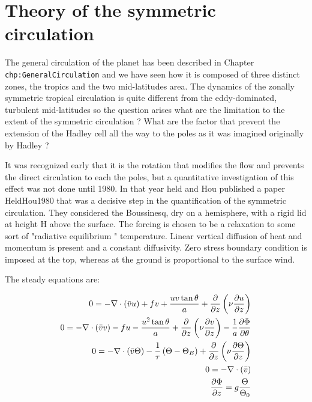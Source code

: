 \section{Theory of the symmetric
circulation}\label{theory-of-the-symmetric-circulation}

The general circulation of the planet has been described in Chapter
\texttt{chp:GeneralCirculation} and we have seen how it is composed of
three distinct zones, the tropics and the two mid-latitudes area. The
dynamics of the zonally symmetric tropical circulation is quite
different from the eddy-dominated, turbulent mid-latitudes so the
question arises what are the limitation to the extent of the symmetric
circulation ? What are the factor that prevent the extension of the
Hadley cell all the way to the poles as it was imagined originally by
Hadley ?

It was recognized early that it is the rotation that modifies the flow
and prevents the direct circulation to each the poles, but a
quantitative investigation of this effect was not done until 1980. In
that year held and Hou published a paper HeldHou1980 that was a decisive
step in the quantification of the symmetric circulation. They considered
the Boussinesq, dry on a hemisphere, with a rigid lid at height H above
the surface. The forcing is chosen to be a relaxation to some sort of
"radiative equilibrium " temperature. Linear vertical diffusion of heat
and momentum is present and a constant diffusivity. Zero stress boundary
condition is imposed at the top, whereas at the ground is proportional
to the surface wind.

The steady equations are:

\[\begin{aligned}
0 = -\nabla\cdot(\bar{v}u) + fv +\frac{u v \tan\theta}{a} + \frac{\partial }{\partial z}\left(\nu\frac{\partial u}{\partial z}\right) \\
0 = -\nabla\cdot(\bar{v}v) - fu -\frac{u^2 \tan\theta}{a} + \frac{\partial }{\partial z}\left(\nu\frac{\partial v}{\partial z}\right) -\frac{1}{a}\frac{\partial \Phi}{\partial \theta}\\
0 = -\nabla\cdot(\bar{v}\Theta) -\frac{1}{\tau}\left(\Theta -\Theta_E\right) + \frac{\partial }{\partial z}\left(\nu\frac{\partial \Theta}{\partial z}\right) \\
0 = -\-\nabla\cdot(\bar{v})\\
\frac{\partial \Phi}{\partial z} = g\frac{\Theta}{\Theta_0}
\end{aligned}\]

